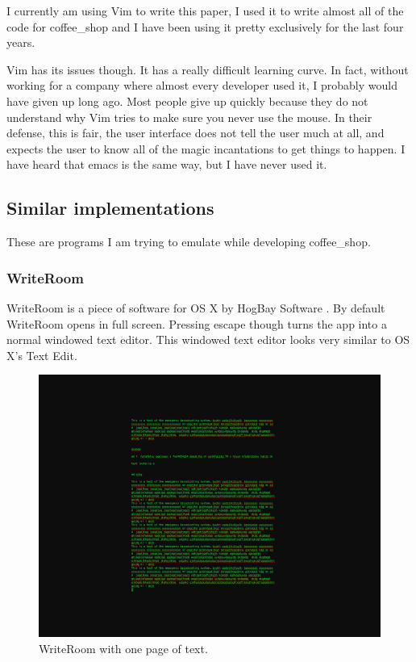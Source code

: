\documentclass[10pt]{article}
\begin{document}
I currently am using Vim to write this paper, I used it to write almost all of the code for coffee\_shop and I have been using it pretty exclusively for the last four years.

Vim has its issues though. It has a really difficult learning curve. In fact, without working for a company where almost every developer used it, I probably would have given up long ago. Most people give up quickly because they do not understand why Vim tries to make sure you never use the mouse. In their defense, this is fair, the user interface does not tell the user much at all, and expects the user to know all of the magic incantations to get things to happen. I have heard that emacs is the same way, but I have never used it.

\subsection{Similar implementations}

These are programs I am trying to emulate while developing coffee\_shop.

\subsubsection{WriteRoom}

WriteRoom is a piece of software for OS X by HogBay Software \cite{writeroom}. By default WriteRoom opens in full screen. Pressing escape though turns the app into a normal windowed text editor. This windowed text editor looks very similar to OS X's Text Edit.

\begin{figure}
   \centering
      \includegraphics[width=130mm]{images/writeroom1.png}
   \caption{WriteRoom with one page of text.}
\end{figure}
\end{document}

